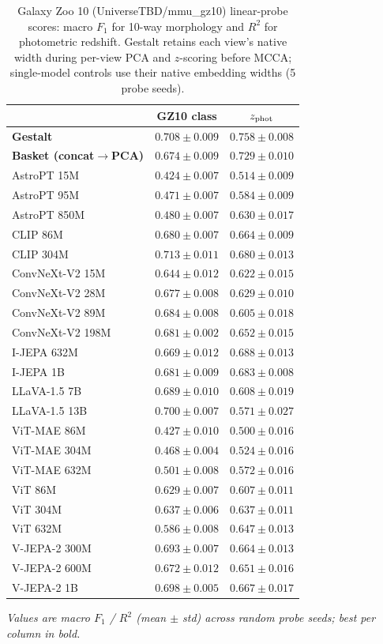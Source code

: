 \begin{table}[t]
\centering
\scriptsize
\setlength{\tabcolsep}{4pt}
\caption{Galaxy Zoo 10 (UniverseTBD/mmu\_gz10) linear-probe scores: macro $F_1$ for 10-way morphology and $R^2$ for photometric redshift. Gestalt retains each view's native width during per-view PCA and $z$-scoring before MCCA; single-model controls use their native embedding widths (5 probe seeds).}
\label{tab:gz10}
\begin{tabular}{lcc}
\toprule
 & GZ10 class & $z_{\rm phot}$ \\
\midrule
\textbf{Gestalt} & $0.708 \pm 0.009$ & $\mathbf{0.758 \pm 0.008}$ \\
\textbf{Basket (concat$\to$PCA)} & $0.674 \pm 0.009$ & $0.729 \pm 0.010$ \\
\midrule
AstroPT 15M & $0.424 \pm 0.007$ & $0.514 \pm 0.009$ \\
AstroPT 95M & $0.471 \pm 0.007$ & $0.584 \pm 0.009$ \\
AstroPT 850M & $0.480 \pm 0.007$ & $0.630 \pm 0.017$ \\
CLIP 86M & $0.680 \pm 0.007$ & $0.664 \pm 0.009$ \\
CLIP 304M & $\mathbf{0.713 \pm 0.011}$ & $0.680 \pm 0.013$ \\
ConvNeXt-V2 15M & $0.644 \pm 0.012$ & $0.622 \pm 0.015$ \\
ConvNeXt-V2 28M & $0.677 \pm 0.008$ & $0.629 \pm 0.010$ \\
ConvNeXt-V2 89M & $0.684 \pm 0.008$ & $0.605 \pm 0.018$ \\
ConvNeXt-V2 198M & $0.681 \pm 0.002$ & $0.652 \pm 0.015$ \\
I-JEPA 632M & $0.669 \pm 0.012$ & $0.688 \pm 0.013$ \\
I-JEPA 1B & $0.681 \pm 0.009$ & $0.683 \pm 0.008$ \\
LLaVA-1.5 7B & $0.689 \pm 0.010$ & $0.608 \pm 0.019$ \\
LLaVA-1.5 13B & $0.700 \pm 0.007$ & $0.571 \pm 0.027$ \\
ViT-MAE 86M & $0.427 \pm 0.010$ & $0.500 \pm 0.016$ \\
ViT-MAE 304M & $0.468 \pm 0.004$ & $0.524 \pm 0.016$ \\
ViT-MAE 632M & $0.501 \pm 0.008$ & $0.572 \pm 0.016$ \\
ViT 86M & $0.629 \pm 0.007$ & $0.607 \pm 0.011$ \\
ViT 304M & $0.637 \pm 0.006$ & $0.637 \pm 0.011$ \\
ViT 632M & $0.586 \pm 0.008$ & $0.647 \pm 0.013$ \\
V-JEPA-2 300M & $0.693 \pm 0.007$ & $0.664 \pm 0.013$ \\
V-JEPA-2 600M & $0.672 \pm 0.012$ & $0.651 \pm 0.016$ \\
V-JEPA-2 1B & $0.698 \pm 0.005$ & $0.667 \pm 0.017$ \\
\bottomrule
\end{tabular}
\par\smallskip\textit{Values are macro $F_1$ / $R^2$ (mean $\pm$ std) across random probe seeds; best per column in bold.}
\end{table}
